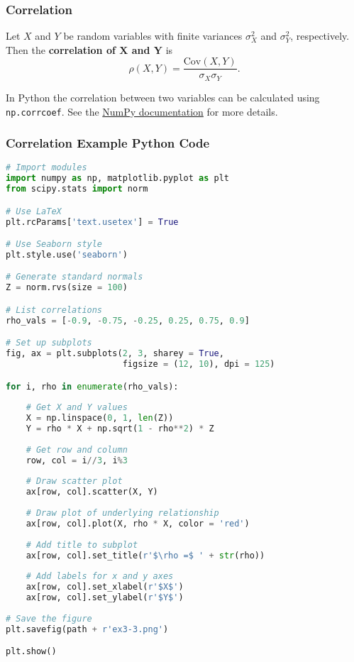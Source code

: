 \documentclass{beamer}
\begin{document}
\begin{frame}
\frametitle{Correlation}
\begin{Definition} 
Let $X$ and $Y$ be random variables with finite variances $\sigma_X^2$ and $\sigma_Y^2$, respectively. Then the {\bf correlation of $\boldsymbol X$ and $\boldsymbol Y$} is
$$
\rho(X, Y) = \frac{\text{Cov}(X, Y)}{\sigma_X\sigma_Y}.
$$
\end{Definition}
In Python the correlation between two variables can be calculated using \texttt{np.corrcoef}. See the \href{https://numpy.org/doc/stable/reference/generated/numpy.corrcoef.html}{NumPy documentation} for more details.
\end{frame}

\begin{frame}[fragile]
\frametitle{Correlation Example Python Code}
\begin{multicols}{2}
\begin{lstlisting}[language=Python]
# Import modules
import numpy as np, matplotlib.pyplot as plt
from scipy.stats import norm

# Use LaTeX
plt.rcParams['text.usetex'] = True

# Use Seaborn style
plt.style.use('seaborn')

# Generate standard normals
Z = norm.rvs(size = 100)

# List correlations
rho_vals = [-0.9, -0.75, -0.25, 0.25, 0.75, 0.9]

# Set up subplots
fig, ax = plt.subplots(2, 3, sharey = True, 
                       figsize = (12, 10), dpi = 125)

for i, rho in enumerate(rho_vals):
    
    # Get X and Y values
    X = np.linspace(0, 1, len(Z))
    Y = rho * X + np.sqrt(1 - rho**2) * Z
    
    # Get row and column
    row, col = i//3, i%3
    
    # Draw scatter plot
    ax[row, col].scatter(X, Y)
    
    # Draw plot of underlying relationship
    ax[row, col].plot(X, rho * X, color = 'red')
    
    # Add title to subplot
    ax[row, col].set_title(r'$\rho =$ ' + str(rho))
    
    # Add labels for x and y axes
    ax[row, col].set_xlabel(r'$X$')
    ax[row, col].set_ylabel(r'$Y$')
    
# Save the figure
plt.savefig(path + r'ex3-3.png')

plt.show()
\end{lstlisting}
\end{multicols}
\end{frame}
\end{document}
